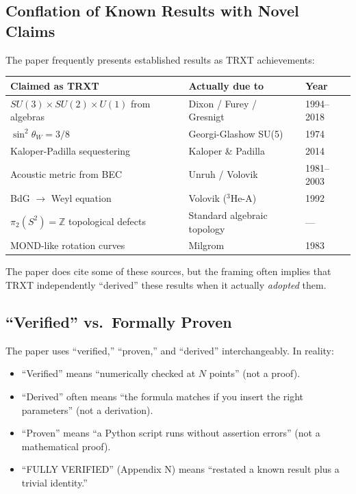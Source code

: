 \documentclass[12pt, a4paper]{article}
\begin{document}
\subsection{Conflation of Known Results with Novel Claims}

The paper frequently presents established results as TRXT achievements:

\begin{center}
\begin{tabular}{lll}
\toprule
Claimed as TRXT & Actually due to & Year \\
\midrule
$SU(3) \times SU(2) \times U(1)$ from algebras & Dixon / Furey / Gresnigt & 1994--2018 \\
$\sin^2\theta_W = 3/8$ & Georgi-Glashow SU(5) & 1974 \\
Kaloper-Padilla sequestering & Kaloper \& Padilla & 2014 \\
Acoustic metric from BEC & Unruh / Volovik & 1981--2003 \\
BdG $\to$ Weyl equation & Volovik ($^3$He-A) & 1992 \\
$\pi_2(S^2) = \mathbb{Z}$ topological defects & Standard algebraic topology & --- \\
MOND-like rotation curves & Milgrom & 1983 \\
\bottomrule
\end{tabular}
\end{center}

The paper does cite some of these sources, but the framing often implies that TRXT independently ``derived'' these results when it actually \emph{adopted} them.

\subsection{``Verified'' vs.\ Formally Proven}

The paper uses ``verified,'' ``proven,'' and ``derived'' interchangeably. In reality:

\begin{itemize}
    \item ``Verified'' means ``numerically checked at $N$ points'' (not a proof).
    \item ``Derived'' often means ``the formula matches if you insert the right parameters'' (not a derivation).
    \item ``Proven'' means ``a Python script runs without assertion errors'' (not a mathematical proof).
    \item ``FULLY VERIFIED'' (Appendix N) means ``restated a known result plus a trivial identity.''
\end{itemize}
\end{document}
